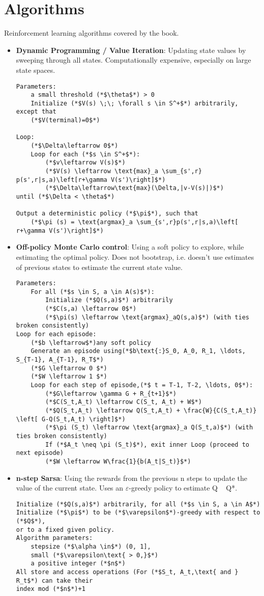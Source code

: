 \documentclass[12pt]{article}
\begin{document}
\section{Algorithms}
Reinforcement learning algorithms covered by the book.
\begin{itemize}
	\item\textbf{Dynamic Programming / Value Iteration}: Updating state values by sweeping through all states.
		Computationally expensive, especially on large state spaces.
	\begin{lstlisting}
Parameters:
	a small threshold (*$\theta$*) > 0 
	Initialize (*$V(s) \;\; \forall s \in S^+$*) arbitrarily, except that
	(*$V(terminal)=0$*) 

Loop:
	(*$\Delta\leftarrow 0$*)
	Loop for each (*$s \in S^+$*):
		(*$v\leftarrow V(s)$*)
		(*$V(s) \leftarrow \text{max}_a \sum_{s',r} p(s',r|s,a)\left[r+\gamma V(s')\right]$*)
		(*$\Delta\leftarrow\text{max}(\Delta,|v-V(s)|)$*)
until (*$\Delta < \theta$*)

Output a deterministic policy (*$\pi$*), such that
	(*$\pi (s) = \text{argmax}_a \sum_{s',r}p(s',r|s,a)\left[ r+\gamma V(s')\right]$*)
		\end{lstlisting}

	\item\textbf{Off-policy Monte Carlo control}: Using a soft policy to explore, while estimating the
		optimal policy. Does not bootstrap, i.e. doesn't use estimates of previous states to estimate the
		current state value.
			\begin{lstlisting}
Parameters:
	For all (*$s \in S, a \in A(s)$*):
		Initialize (*$Q(s,a)$*) arbitrarily
		(*$C(s,a) \leftarrow 0$*)
		(*$\pi(s) \leftarrow \text{argmax}_aQ(s,a)$*) (with ties broken consistently)
Loop for each episode:
	(*$b \leftarrow$*)any soft policy
	Generate an episode using(*$b\text{:}S_0, A_0, R_1, \ldots, S_{T-1}, A_{T-1}, R_T$*)
	(*$G \leftarrow 0 $*)
	(*$W \leftarrow 1 $*)
	Loop for each step of episode,(*$ t = T-1, T-2, \ldots, 0$*):
		(*$G\leftarrow \gamma G + R_{t+1}$*)
		(*$C(S_t,A_t) \leftarrow C(S_t, A_t) + W$*)
		(*$Q(S_t,A_t) \leftarrow Q(S_t,A_t) + \frac{W}{C(S_t,A_t)} \left[ G-Q(S_t,A_t) \right]$*)
		(*$\pi (S_t) \leftarrow \text{argmax}_a Q(S_t,a)$*) (with ties broken consistently)
		If (*$A_t \neq \pi (S_t)$*), exit inner Loop (proceed to next episode)
		(*$W \leftarrow W\frac{1}{b(A_t|S_t)}$*)
			\end{lstlisting}


	\item\textbf{n-step Sarsa}: Using the rewards from the previous n steps to update the value of the current state. 
	Uses an $\varepsilon$-greedy policy to estimate Q ~ Q*.
	\begin{lstlisting}
Initialize (*$Q(s,a)$*) arbitrarily, for all (*$s \in S, a \in A$*)
Initialize (*$\pi$*) to be (*$\varepsilon$*)-greedy with respect to  (*$Q$*),
or to a fixed given policy.
Algorithm parameters:
	stepsize (*$\alpha \in$*) (0, 1],
	small (*$\varepsilon\text{ > 0,}$*)
	a positive integer (*$n$*)
All store and access operations (For (*$S_t, A_t,\text{ and } R_t$*) can take their
index mod (*$n$*)+1
	\end{lstlisting}
		
\end{itemize}
\end{document}
